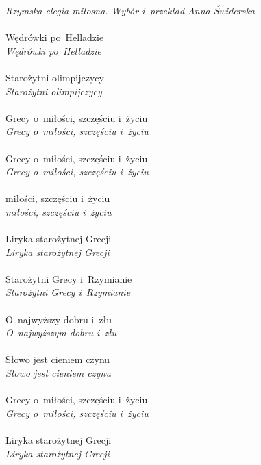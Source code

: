 \documentclass[a4paper,11pt]{article}
\begin{document}
\Powin \emph{Rzymska elegia miłosna. Wybór i~przekład Anna Świderska} \\
 \\
\Jest  Wędrówki po~Helladzie \\
\Powin \emph{Wędrówki po~Helladzie} \\
 \\
\Jest  Starożytni olimpijczycy \\
\Powin \emph{Starożytni olimpijczycy} \\
 \\
\Jest  Grecy o~miłości, szczęściu i~życiu \\
\Powin \emph{Grecy o~miłości, szczęściu i~życiu} \\
 \\
\Jest  Grecy o~miłości, szczęściu i~życiu \\
\Powin \emph{Grecy o~miłości, szczęściu i~życiu} \\
 \\
\Jest  miłości, szczęściu i~życiu \\
\Powin \emph{miłości, szczęściu i~życiu} \\
 \\
\Jest  Liryka starożytnej Grecji \\
\Powin \emph{Liryka starożytnej Grecji} \\
 \\
\Jest  Starożytni Grecy i~Rzymianie \\
\Powin \emph{Starożytni Grecy i~Rzymianie} \\
 \\
\Jest  O~najwyższy dobru i~złu \\
\Powin \emph{O~najwyższym dobru i~złu} \\
 \\
\Jest  Słowo jest cieniem czynu \\
\Powin \emph{Słowo jest cieniem czynu} \\
 \\
\Jest  Grecy o~miłości, szczęściu i~życiu \\
\Powin \emph{Grecy o~miłości, szczęściu i~życiu} \\
 \\
\Jest  Liryka starożytnej Grecji \\
\Powin \emph{Liryka starożytnej Grecji} \\
 \\
\end{document}
